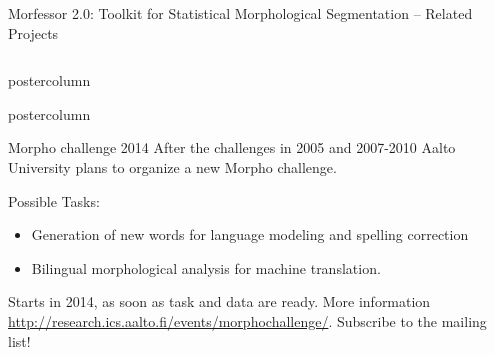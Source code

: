 \documentclass[final]{beamer} %
\begin{document}
\begin{frame}{Morfessor 2.0: Toolkit for Statistical Morphological Segmentation -- Related Projects}
\begin{columns}
\begin{column}{.49\textwidth}
\begin{beamercolorbox}[center,wd=\textwidth]{postercolumn}
	\end{beamercolorbox}
\vfill



  \begin{beamercolorbox}[center,wd=\textwidth]{postercolumn}
 \begin{block}{Morpho challenge 2014}
            After the challenges in 2005 and 2007-2010 Aalto University plans to organize a new Morpho challenge.

	Possible Tasks:       \begin{itemize}
		\item Generation of new words for language modeling and spelling correction
\item Bilingual morphological analysis for machine translation.
              \end{itemize}  

Starts in 2014, as soon as task and data are ready. More information \url{http://research.ics.aalto.fi/events/morphochallenge/}. Subscribe to the mailing list!
            \end{block}
            
	\end{beamercolorbox}




\end{column}
\end{columns}
\end{frame}
\end{document}
